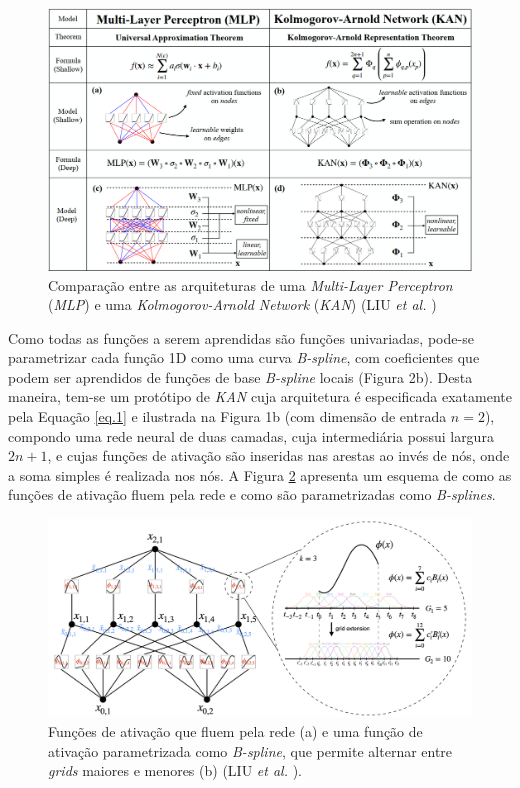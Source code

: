 \documentclass[journal]{IEEEtran}
\begin{document}
\begin{figure}[h!]
	\centering
	\includegraphics[width=0.9 \textwidth]{Figures/Fig1.png}
	\caption{Comparação entre as arquiteturas de uma \textit{Multi-Layer Perceptron} (\textit{MLP}) e uma \textit{Kolmogorov-Arnold Network} (\textit{KAN}) (LIU \textit{et al.} \cite{liu})}
	\label{fig:1}
\end{figure}


Como todas as funções a serem aprendidas são funções univariadas, pode-se parametrizar cada função 1D como uma curva \textit{B-spline}, com coeficientes que podem ser aprendidos de funções de base \textit{B-spline} locais (Figura 2b). Desta maneira, tem-se um protótipo de \textit{KAN} cuja arquitetura é especificada exatamente pela Equação \ref{eq.1} e ilustrada na Figura 1b (com dimensão de entrada $n = 2$), compondo uma rede neural de duas camadas, cuja intermediária possui largura $2n+1$, e cujas funções de ativação são inseridas nas arestas ao invés de nós, onde a soma simples é realizada nos nós. A Figura \ref{fig:2} apresenta um esquema de como as funções de ativação fluem pela rede e como são parametrizadas como \textit{B-splines}.

\begin{figure}[h!]
	\centering
	\includegraphics[width=0.9 \textwidth]{Figures/Fig2.png}
	\caption{Funções de ativação que fluem pela rede (a) e uma função de ativação parametrizada como \textit{B-spline}, que permite alternar entre \textit{grids} maiores e menores (b) (LIU \textit{et al.} \cite{liu}).}
	\label{fig:2}
\end{figure}
\end{document}
